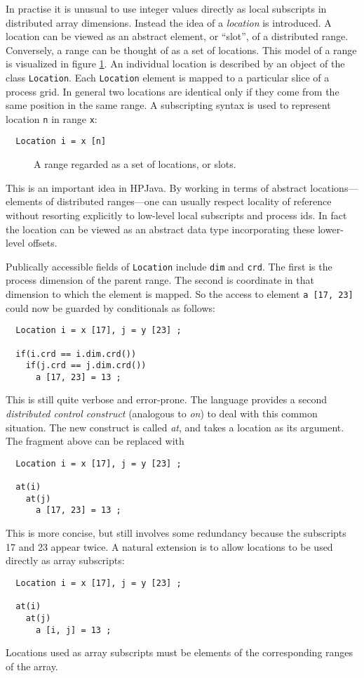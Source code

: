 In practise it is unusual to use integer values directly as local
subscripts in distributed array dimensions.
Instead the idea of a {\em location} is introduced.  A
location can be viewed as an abstract element, or ``slot'', of a
distributed range.
Conversely, a range can be thought of as a set of locations.
This model of a range is visualized in
figure \ref{rangeSlots}.
An individual location is described by an object of the class {\tt Location}.
Each {\tt Location} element is mapped
to a particular slice of a process grid.
In general two locations are identical only
if they come from the same position in the same range.
A subscripting syntax is used to represent
location {\tt n} in range {\tt x}:
\small
\begin{verbatim}
  Location i = x [n]
\end{verbatim}
\normalsize

\begin{figure}[btp]
\centerline{}
\caption{\label{rangeSlots}A range regarded as a set of locations,
or slots.}
\end{figure}

This is an important idea in HPJava.  By working in terms of
abstract locations---elements of distributed ranges---one can usually
respect locality of reference without resorting explicitly to low-level
local subscripts and process ids.  In fact the location can be viewed
as an abstract data type incorporating these lower-level offsets.

Publically accessible fields of {\tt Location} include {\tt dim}
and {\tt crd}.  The first is the process dimension of the parent
range.  The second is coordinate in that dimension to which the element
is mapped.  So the access to element {\tt a [17, 23]}
could now be guarded by conditionals as follows:
\small
\begin{verbatim}
  Location i = x [17], j = y [23] ;

  if(i.crd == i.dim.crd())
    if(j.crd == j.dim.crd())
      a [17, 23] = 13 ;
\end{verbatim}
\normalsize
This is still quite verbose and error-prone.  The language provides a
second {\em distributed control construct} (analogous to {\em on}) to deal
with this common situation.  The new construct is called {\em at}, and
takes a location as its argument.  The
fragment above can be replaced with
\small
\begin{verbatim}
  Location i = x [17], j = y [23] ;

  at(i)
    at(j)
      a [17, 23] = 13 ;
\end{verbatim}
\normalsize
This is more concise, but still involves some redundancy because the
subscripts 17 and 23 appear twice.  A natural extension is to allow
locations to be used directly as array subscripts:
\small
\begin{verbatim}
  Location i = x [17], j = y [23] ;

  at(i)
    at(j)
      a [i, j] = 13 ;
\end{verbatim}
\normalsize
Locations used as array subscripts must be elements of the
corresponding ranges of the array.

